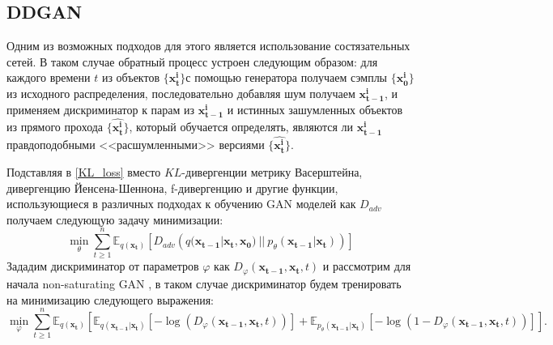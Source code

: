 \documentclass{article}
\begin{document}
\subsection{DDGAN}
Одним из возможных подходов для этого является использование состязательных сетей. В таком случае обратный процесс устроен следующим образом: для каждого времени $t$ из объектов $\{\mathbf{x_t^i}\}$с помощью генератора получаем сэмплы $\{\mathbf{x_0^i}\}$ из исходного распределения, последовательно добавляя шум получаем $\mathbf{x_{t-1}^i}$, и применяем дискриминатор к парам из $\mathbf{x_{t-1}^i}$ и истинных зашумленных объектов из прямого прохода $\{\mathbf{\widehat{x_t^i}}\}$, который обучается определять, являются ли $\mathbf{x_{t-1}^i}$ правдоподобными <<расшумленными>> версиями $\{\mathbf{\widehat{x_t^i}}\}$. 

Подставляя в \ref{KL_loss} вместо $KL$-дивергенции метрику Васерштейна, дивергенцию Йенсена-Шеннона, f-дивергенцию и другие функции, использующиеся в различных подходах к обучению GAN моделей \cite{https://doi.org/10.48550/arxiv.1406.2661, 
		https://doi.org/10.48550/arxiv.1701.07875,
		https://doi.org/10.48550/arxiv.1606.00709,
		https://doi.org/10.48550/arxiv.2010.08029} 
как $D_{adv}$
получаем следующую задачу минимизации:
 \begin{equation}
	\min\limits_\theta\sum\limits_{t\geqslant 1}^n \mathbb{E}_{q(\mathbf{x_t})}[ D_{adv}\left(q(\mathbf{x_{t-1}}|\mathbf{x_t}, \mathbf{x_0})~||~p_\theta(\mathbf{x_{t-1}}|\mathbf{x_t})  \right)]
\end{equation}
Зададим дискриминатор от параметров $\varphi$ как $D_\varphi(\mathbf{x_{t-1}}, \mathbf{x_t}, t)$ и рассмотрим для начала non-saturating GAN \cite{https://doi.org/10.48550/arxiv.1406.2661}, в таком случае дискриминатор будем тренировать на минимизацию следующего выражения:
 \begin{equation}
	\min\limits_\varphi\sum\limits_{t\geqslant 1}^n \mathbb{E}_{q(\mathbf{x_t})}[\mathbb{E}_{q(\mathbf{x_{t-1}}|\mathbf{x_t})}[-\log{ (D_\varphi(\mathbf{x_{t-1}}, \mathbf{x_t}, t) ) }] + \mathbb{E}_{p_\theta(\mathbf{x_{t-1}}|\mathbf{x_t})}[-\log{  (1 - D_\varphi(\mathbf{x_{t-1}}, \mathbf{x_t}, t))  }]].
\end{equation}
\end{document}
